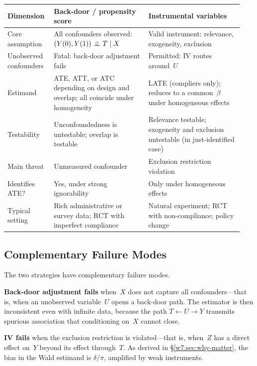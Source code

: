 \documentclass[master.tex]{subfiles}
\begin{document}
\begin{table}[h]
\centering
\renewcommand{\arraystretch}{1.7}
\begin{tabular}{p{0.18\linewidth} p{0.38\linewidth} p{0.38\linewidth}}
  \toprule
  \textbf{Dimension}
    & \textbf{Back-door / propensity score}
    & \textbf{Instrumental variables} \\
  \midrule
  Core assumption
    & All confounders observed:
      $(Y(0),Y(1)) \perp\!\!\!\perp T \mid X$
    & Valid instrument: relevance, exogeneity,
      exclusion \\[4pt]
  Unobserved confounders
    & Fatal: back-door adjustment fails
    & Permitted: IV routes around~$U$ \\[4pt]
  Estimand
    & ATE, ATT, or ATC depending on design
      and overlap; all coincide under
      homogeneity
    & LATE (compliers only); reduces to a
      common~$\beta$ under homogeneous effects \\[4pt]
  Testability
    & Unconfoundedness is untestable;
      overlap is testable
    & Relevance testable; exogeneity and
      exclusion untestable (in just-identified
      case) \\[4pt]
  Main threat
    & Unmeasured confounder
    & Exclusion restriction violation \\[4pt]
  Identifies ATE?
    & Yes, under strong ignorability
    & Only under homogeneous effects \\[4pt]
  Typical setting
    & Rich administrative or survey data;
      RCT with imperfect compliance
    & Natural experiment; RCT with
      non-compliance; policy change \\
  \bottomrule
\end{tabular}
\renewcommand{\arraystretch}{1}
\end{table}

\subsection{Complementary Failure Modes}

The two strategies have complementary failure modes.

\medskip\noindent\textbf{Back-door adjustment fails} when~$X$ does
not capture all confounders---that is, when an unobserved
variable~$U$ opens a back-door path.  The estimator is then
inconsistent even with infinite data, because the path
$T \leftarrow U \rightarrow Y$ transmits spurious association
that conditioning on~$X$ cannot close.

\medskip\noindent\textbf{IV fails} when the exclusion restriction
is violated---that is, when~$Z$ has a direct effect on~$Y$ beyond
its effect through~$T$.  As derived in
\S\ref{w7:sec:why-matter}, the bias in the Wald estimand is
$\delta/\pi$, amplified by weak instruments.
\end{document}
